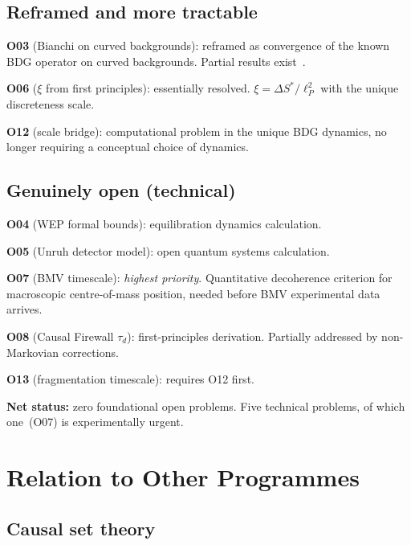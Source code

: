 \documentclass[11pt,a4paper]{article}
\theoremstyle{plain}
\theoremstyle{definition}
\theoremstyle{remark}
\begin{document}
\subsection{Reframed and more tractable}\label{sec:open-reframed}

\textbf{O03} (Bianchi on curved backgrounds): reframed as convergence of the
known BDG operator on curved backgrounds.  Partial results
exist~\cite{MachetWang2020}.

\textbf{O06} ($\xi$ from first principles): essentially resolved.
$\xi = \Delta S^*/\ell_P^2$ with the unique discreteness scale.

\textbf{O12} (scale bridge): computational problem in the unique BDG dynamics,
no longer requiring a conceptual choice of dynamics.

\subsection{Genuinely open (technical)}\label{sec:open-tech}

\textbf{O04} (WEP formal bounds): equilibration dynamics calculation.

\textbf{O05} (Unruh detector model): open quantum systems calculation.

\textbf{O07} (BMV timescale): \emph{highest priority}.  Quantitative
decoherence criterion for macroscopic centre-of-mass position, needed before BMV
experimental data arrives.

\textbf{O08} (Causal Firewall $\tau_d$): first-principles derivation.
Partially addressed by non-Markovian corrections.

\textbf{O13} (fragmentation timescale): requires O12 first.

\medskip
\noindent\textbf{Net status:} zero foundational open problems.  Five technical
problems, of which one~(O07) is experimentally urgent.

\section{Relation to Other Programmes}\label{sec:other}

\subsection{Causal set theory}\label{sec:cst}
\end{document}
